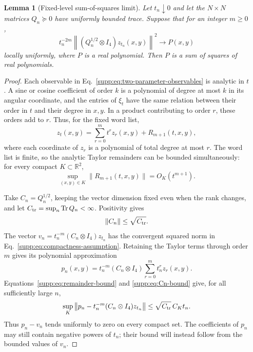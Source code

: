 \documentclass[aps,prl,onecolumn,10pt,superscriptaddress,nofootinbib,longbibliography]{revtex4-2}
\newtheorem{lemma}[theorem]{Lemma}
\theoremstyle{remark}
\newcommand{\R}{\mathbb R}
\newcommand{\Tr}{\operatorname{Tr}}
\begin{document}
\begin{lemma}[Fixed-level sum-of-squares limit]
\label{supp:lem:fixed-level-limit}
Let $t_n\downarrow0$ and let the $N\times N$ matrices $Q_n\succeq0$ have uniformly bounded trace. Suppose that for an integer $m\geq0$,
\begin{equation}
t_n^{-2m}\left\|(Q_n^{1/2}\otimes I_4)z_{t_n}(x,y)\right\|^2
\longrightarrow P(x,y)
\label{supp:eq:compactness-assumption}
\end{equation}
locally uniformly, where $P$ is a real polynomial. Then $P$ is a sum of squares of real polynomials.
\end{lemma}

\begin{proof}
Each observable in Eq.~\eqref{supp:eq:two-parameter-observables} is analytic in $t$. A sine or cosine coefficient of order $k$ is a polynomial of degree at most $k$ in its angular coordinate, and the entries of $\xi_t$ have the same relation between their order in $t$ and their degree in $x,y$. In a product contributing to order $r$, these orders add to $r$. Thus, for the fixed word list,
\begin{equation}
z_t(x,y)=\sum_{r=0}^{m}t^rz_r(x,y)+R_{m+1}(t,x,y),
\label{supp:eq:z-Taylor}
\end{equation}
where each coordinate of $z_r$ is a polynomial of total degree at most $r$. The word list is finite, so the analytic Taylor remainders can be bounded simultaneously: for every compact $K\subset\R^2$,
\begin{equation}
\sup_{(x,y)\in K}\|R_{m+1}(t,x,y)\|=O_K(t^{m+1}).
\label{supp:eq:remainder-bound}
\end{equation}

Take $C_n=Q_n^{1/2}$, keeping the vector dimension fixed even when the rank changes, and let $C_{\rm tr}=\sup_n\Tr Q_n<\infty$. Positivity gives
\begin{equation}
\|C_n\|\leq\sqrt{C_{\rm tr}}.
\label{supp:eq:Cn-bound}
\end{equation}
The vector $v_n=t_n^{-m}(C_n\otimes I_4)z_{t_n}$ has the convergent squared norm in Eq.~\eqref{supp:eq:compactness-assumption}. Retaining the Taylor terms through order $m$ gives its polynomial approximation
\begin{equation}
p_n(x,y)=t_n^{-m}(C_n\otimes I_4)
\sum_{r=0}^{m}t_n^rz_r(x,y).
\label{supp:eq:pn-definition}
\end{equation}
Equations~\eqref{supp:eq:remainder-bound} and \eqref{supp:eq:Cn-bound} give, for all sufficiently large $n$,
\begin{equation}
\sup_K\left\|p_n-t_n^{-m}(C_n\otimes I_4)z_{t_n}\right\|
\leq\sqrt{C_{\rm tr}}\,C_Kt_n.
\label{supp:eq:pn-remainder}
\end{equation}
Thus $p_n-v_n$ tends uniformly to zero on every compact set. The coefficients of $p_n$ may still contain negative powers of $t_n$; their bound will instead follow from the bounded values of $v_n$.


\end{proof}
\end{document}
